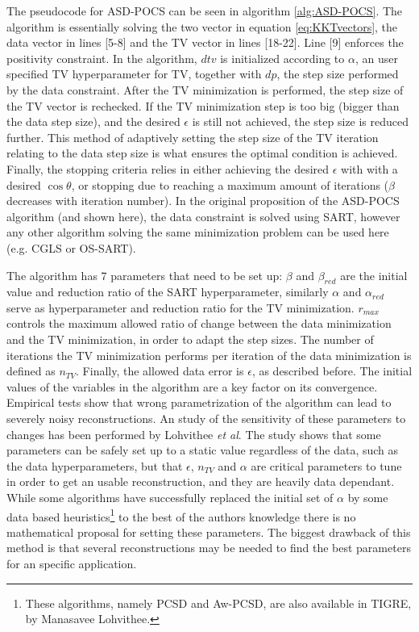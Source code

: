 The pseudocode for ASD-POCS can be seen in algorithm \ref{alg:ASD-POCS}. The algorithm is essentially solving the two vector in equation \ref{eq:KKTvectors}, the data vector in lines [5-8] and the TV vector in lines [18-22]. Line [9] enforces the positivity constraint. In the algorithm, $dtv$ is initialized according to $\alpha$, an user specified   TV hyperparameter for TV, together with $dp$, the step size performed by the data constraint. After the TV minimization is performed, the step size of the TV vector is rechecked. If the TV minimization step is too big (bigger than the data step size), and the desired $\epsilon$ is still not achieved, the step size is reduced further. This method of adaptively setting the step size of the TV iteration relating to the data step size is what ensures the optimal condition is achieved. Finally, the stopping criteria relies in either achieving the desired $\epsilon$ with with a desired $\cos \theta$, or stopping due to reaching a maximum amount of iterations ($\beta$ decreases with iteration number). In the original proposition of the ASD-POCS algorithm (and shown here), the data constraint is solved using SART, however any other algorithm solving the same minimization problem can be used here (e.g. CGLS or OS-SART).


The algorithm has 7 parameters that need to be set up: $\beta$ and $\beta_{red}$ are the initial value and reduction ratio of the SART hyperparameter, similarly $\alpha$ and $\alpha_{red}$ serve as hyperparameter and reduction ratio for the TV minimization. $r_{max}$ controls the maximum allowed ratio of change between the data minimization and the TV minimization, in order to adapt the step sizes. The number of iterations the TV minimization performs per iteration of the data minimization is defined as $n_{TV}$. Finally, the allowed data error is $\epsilon$, as described before. The initial values of the variables in the algorithm are a key factor on its convergence. Empirical tests show that wrong parametrization of the algorithm can lead to severely noisy reconstructions. An study of the sensitivity of these parameters to changes has been performed by Lohvithee \emph{et al}\cite{Vee}. The study shows that some parameters can be safely set up to a static value regardless of the data, such as the data hyperparameters, but that $\epsilon$, $n_{TV}$ and $\alpha$ are critical parameters to tune in order to get an usable reconstruction, and they are heavily data dependant. While some algorithms have successfully replaced the initial set of $\alpha$ by some data based heuristics\cite{liu2015reconstruction}\footnote{These algorithms, namely PCSD and Aw-PCSD, are also available in TIGRE, by Manasavee Lohvithee.} to the best of the authors knowledge there is no mathematical proposal for setting these parameters. The biggest drawback of this method is that several reconstructions may be needed to find the best parameters for an specific application.

